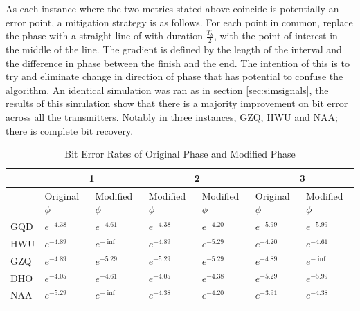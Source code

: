 As each instance where the two metrics stated above coincide is potentially an error point, a mitigation strategy is as follows. For each point in common, replace the phase with a straight line of with duration $\frac{T_b}{2}$, with the point of interest in the middle of the line. The gradient is defined by the length of the interval and the difference in phase between the finish and the end. The intention of this is to try and eliminate change in direction of phase that has potential to confuse the algorithm. An identical simulation was ran as in section \ref{sec:simsignals}, the results of this simulation show that there is a majority improvement on bit error across all the transmitters. Notably in three instances, GZQ, HWU and NAA; there is complete bit recovery. 

\begin{table}[h!]\centering
    \begin{tabular}{l|l|l|l|l|l|l}
    & \multicolumn{2}{c}{1} & \multicolumn{2}{|c}{2} & \multicolumn{2}{|c}{3} \\
    \hline
     & Original $\phi$ & Modified $\phi$  & Modified $\phi$ & Modified $\phi$ & Original $\phi$ & Modified $\phi$ \\
     \hline
    GQD & $e^{-4.38}$ & $e^{-4.61}$ & $e^{-4.38}$ & $e^{-4.20}$ & $e^{-5.99}$ & $e^{-5.99}$ \\
    HWU & $e^{-4.89}$ & $e^{-\inf}$ & $e^{-4.89}$ & $e^{-5.29}$ & $e^{-4.20}$ & $e^{-4.61}$ \\
    GZQ & $e^{-4.89}$ & $e^{-5.29}$ & $e^{-5.29}$ & $e^{-5.29}$ & $e^{-4.89}$ & $e^{-\inf}$ \\
    DHO & $e^{-4.05}$ & $e^{-4.61}$ & $e^{-4.05}$ & $e^{-4.38}$ & $e^{-5.29}$ & $e^{-5.99}$ \\
    NAA & $e^{-5.29}$ & $e^{-\inf}$ & $e^{-4.38}$ & $e^{-4.20}$ & $e^{-3.91}$ & $e^{-4.38}$
    \end{tabular}%
\caption{Bit Error Rates of Original Phase and Modified Phase}
\label{tab:errCorr}
\end{table}